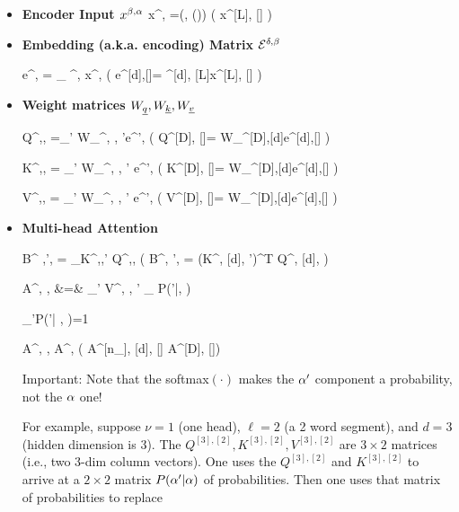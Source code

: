  \begin{itemize}

 \item {\bf Encoder Input $x^{\beta, \alpha}$}
 \beq
 x^{\beta, \alp} =\delta(\beta, \beta(\alp))
 \left(
 x^{[L], [\ell]} 
 \right)
 \eeq

\item {\bf Embedding (a.k.a. encoding) Matrix ${\cal E}^{\delta, \beta}$}

\beq
e^{\delta, \alp} = \sum_\beta
\cale^{\delta, \beta}
x^{\beta, \alp}
\;\;
\left(
e^{[d],[\ell]}= \cale^{[d], [L]}x^{[L], [\ell]}
\right)
\eeq

\item{\bf Weight matrices $W_\rvq, W_\rvk, W_\rvv$}

\beq
Q^{\nu,\delta, \alp}=\sum_{\delta'}
W_\rvq^{\nu, \delta, \delta'}e^{\delta', \alp}
\;\;
\left(
Q^{[D], [\ell]}=
W_\rvq^{[D],[d]}e^{[d],[\ell]}
\right)
\eeq


\beq
K^{\nu,\delta, \alp}=
\sum_{\delta'}
W_\rvk^{\nu, \delta, \delta'}
e^{\delta', \alp}
\;\;
\left(
K^{[D], [\ell]}=
W_\rvk^{[D],[d]}e^{[d],[\ell]}
\right)
\eeq

\beq
V^{\nu,\delta, \alp}=
\sum_{\delta'}
W_\rvv^{\nu, \delta, \delta'}
e^{\delta', \alp}
\;\;
\left(
V^{[D], [\ell]}=
W_\rvv^{[D],[d]}e^{[d],[\ell]}
\right)
\eeq

\item {\bf Multi-head Attention}

\beq
B^{
\nu,{\alp'}, \alp}=
\sum_\delta K^{\nu,\delta,{\alp'}}
Q^{\nu,\delta,\alp}
\;\;
\left(
B^{\nu, {\alp'}, \alp}=
(K^{\nu, [d], \alp'})^T Q^{\nu, [d], \alp}
\right)
\eeq

\beqa
A^{\nu,
\delta, \alp}&=&
\sum_{{\alp'}}
V^{\nu, \delta, {\alp'}}
_{
P({\alp'}|\alp, \nu)}
\eeqa

\beq
\sum_{{\alp'}\in [\ell]}P({\alp'}| \alp, \nu)=1
\eeq

\beq
A^{\nu, \delta, \alp}
\rarrow
A^{\Delta, \alp}
\left(
A^{[n_\rvh], [d], [\ell]}
\rarrow
A^{[D], [\ell]}\right)
\eeq


Important: Note that the softmax$(\cdot)$ makes the
${\alpha'}$ component a probability,
not the $\alpha$ one!

For example, suppose $\nu=1$ (one head), $\ell=2$ (a 2 word segment),
and $d=3$ (hidden dimension is 3).
The $Q^{[3], [2]}, K^{[3], [2]}, V^{[3], [2]}$ are $3\times 2$ matrices
(i.e., two 3-dim column vectors).
One uses the $Q^{[3], [2]}$ and $K^{[3], [2]}$ to arrive at a
$2\times 2$ matrix $P(\alpha'|\alpha)$
of probabilities.
Then one uses that matrix of probabilities to replace


\end{itemize}
